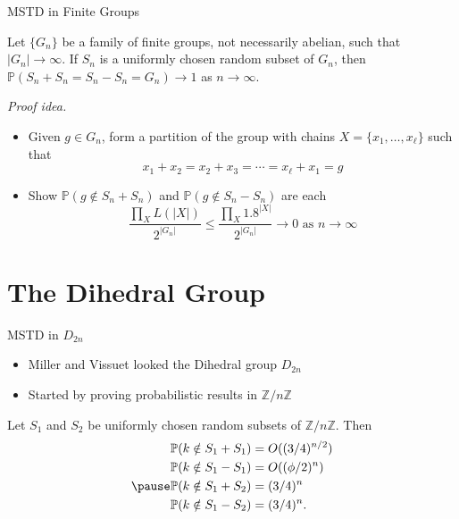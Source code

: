 \documentclass{beamer}
\newcommand{\bi}{\begin{itemize}}
\newcommand{\ei}{\end{itemize}}
\newcommand{\pr}{\mathbb{P}}
\newcommand{\Z}{\mathbb{Z}}
\newcommand{\znz}{\Z / n \Z}
\begin{document}
\begin{frame}{MSTD in Finite Groups}
\begin{theorem}
	Let $\{G_n\}$ be a family of finite groups, not necessarily abelian, such that $|G_n| \to \infty$. If $S_n$ is a uniformly chosen random subset of $G_n$, then $\pr(S_n + S_n = S_n - S_n = G_n) \to 1$ as $n \to \infty$.
\end{theorem}
\pause

\emph{Proof idea.} 
\begin{itemize}
	\item Given $g \in G_n$, form a partition of the group with chains $X = \{x_1, \ldots, x_\ell\}$ such that
		\[
		x_1 + x_2 = x_2 + x_3 = \cdots = x_\ell + x_1 = g
		\]
		\pause
		\vspace{-\baselineskip}
	\item Show $\pr(g \notin S_n + S_n)$ and $\pr(g \notin S_n - S_n)$ are each
		\[
		\frac{\prod_X L(|X|)}{2^{|G_n|}} \leq \frac{\prod_X 1.8^{|X|}}{2^{|G_n|}} \to 0 \text{ as } n \to \infty
		\]
\end{itemize}
\end{frame}

\section{The Dihedral Group}

\begin{frame}{MSTD in $D_{2n}$}
\bi
	\item Miller and Vissuet looked the Dihedral group $D_{2n}$
		\pause
		\bigskip
	\item Started by proving probabilistic results in $\znz$
\ei
\pause
\medskip

\begin{theorem}
	Let $S_1$ and $S_2$ be uniformly chosen random subsets of $\znz$. Then
	\vspace{-\baselineskip}
	\begin{align*}
		\pr(k \notin S_1 + S_1) &= O((3/4)^{n / 2})\\
		\pr(k \notin S_1 - S_1) &= O((\phi/2)^n)\\
		\pause
		\pr(k \notin S_1 + S_2) &= (3/4)^n\\
		\pr(k \notin S_1 - S_2) &= (3/4)^n.
	\end{align*}
\end{theorem}
\end{frame}
\end{document}
